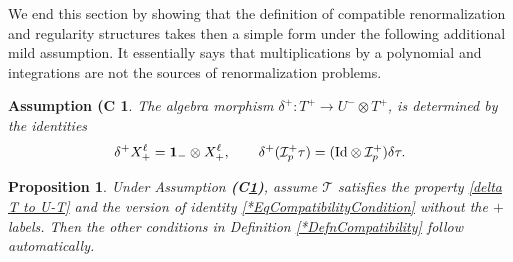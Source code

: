 \documentclass[10pt, reqno]{amsart}
\numberwithin{subsection}{section}
\numberwithin{subsubsection}{subsection}
\numberwithin{equation}{section} %
\theoremstyle{mystyle}
\newtheorem{prop}[thm]{\hspace{-0.13cm} {Proposition}}%
\theoremstyle{mystyle2}
\theoremstyle{mystyle3}
\newtheorem{assumC}{Assumption (C}
\newcommand{\refC}[1]{\textbf{\textsf{(C\ref{#1})}}}
\newcommand{\ssk}{\smallskip}
\newcommand{\mcI}{\mathcal{I}}
\newcommand{\Xplus}{X_+}
\begin{document}
\medskip

We end this section by showing that the definition of compatible renormalization and regularity structures takes then a simple form under the following additional mild assumption. It essentially says that multiplications by a polynomial and integrations are not the sources of renormalization problems.

\ssk

\begin{assumC}\label{C2}
The algebra morphism $\delta^+:T^+\to U^-\otimes T^+$, is determined by the identities
\begin{align}\label{eq relation delta and delta^+}
\delta^+\Xplus^\ell={\bf1}_-\otimes \Xplus^\ell,\qquad
\delta^+(\mcI_p^+\tau)=(\text{\rm Id}\otimes\mcI_p^+)\delta\tau.
\end{align}
\end{assumC}

\ssk

\begin{prop}\label{prop simplification of compatibility}
Under Assumption \refC{C2}, assume $\mathscr{T}$ satisfies the property \eqref{delta T to U-T} and the version of identity \eqref{*EqCompatibilityCondition} without the $+$ labels. Then the other conditions in Definition \ref{*DefnCompatibility} follow automatically.
\end{prop}

\medskip
\end{document}
